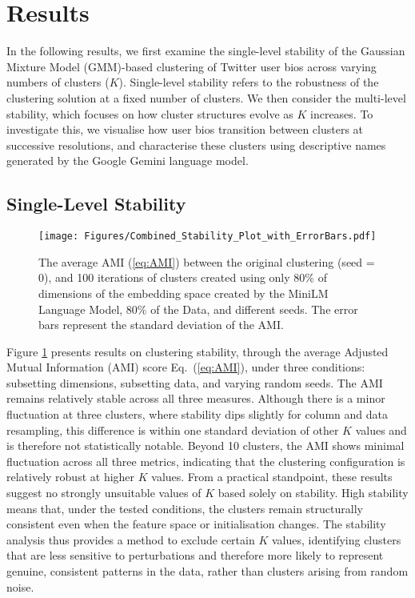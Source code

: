 \documentclass{article}
\begin{document}
\section{{Results}}
In the following results, we first examine the single-level stability of the Gaussian Mixture Model (GMM)-based clustering of Twitter user bios across varying numbers of clusters ($K$). Single-level stability refers to the robustness of the clustering solution at a fixed number of clusters. We then consider the multi-level stability, which focuses on how cluster structures evolve as $K$ increases. To investigate this, we visualise how user bios transition between clusters at successive resolutions, and characterise these clusters using descriptive names generated by the Google Gemini language model.
\subsection*{Single-Level Stability}


\begin{figure}[htbp]
 \begin{flushleft}
  \texttt{[image: Figures/Combined\_Stability\_Plot\_with\_ErrorBars.pdf]}
  \caption{The average AMI (\ref{eq:AMI}) between the original clustering (seed = 0), and 100 iterations of clusters created using only 80\% of dimensions of the embedding space created by the MiniLM Language Model, 80\% of the Data, and different seeds. The error bars represent the standard deviation of the AMI.}
  \label{fig:Stability_Plot_Error}
  \end{flushleft}
\end{figure}

 
Figure \ref{fig:Stability_Plot_Error} presents results on clustering stability, through the average Adjusted Mutual Information (AMI) score Eq.~(\ref{eq:AMI}), under three conditions: subsetting dimensions, subsetting data, and varying random seeds. The AMI remains relatively stable across all three measures. Although there is a minor fluctuation at three clusters, where stability dips slightly for column and data resampling, this difference is within one standard deviation of other $K$ values and is therefore not statistically notable. Beyond 10 clusters, the AMI shows minimal fluctuation across all three metrics, indicating that the clustering configuration is relatively robust at higher $K$ values.
From a practical standpoint, these results suggest no strongly unsuitable values of $K$ based solely on stability. High stability means that, under the tested conditions, the clusters remain structurally consistent even when the feature space or initialisation changes. The stability analysis thus provides a method to exclude certain $K$ values, identifying clusters that are less sensitive to perturbations and therefore more likely to represent genuine, consistent patterns in the data, rather than clusters arising from random noise.
\end{document}

